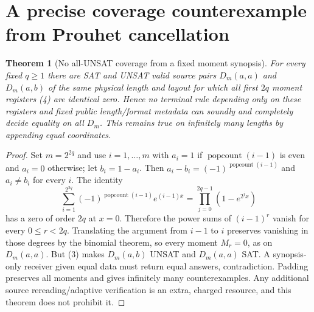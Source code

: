 \documentclass[11pt]{article}
\newtheorem{theorem}{Theorem}
\begin{document}
\section{A precise coverage counterexample from Prouhet cancellation}
\begin{theorem}[No all-UNSAT coverage from a fixed moment synopsis]\label{th:collision}
For every fixed $q\ge1$ there are SAT and UNSAT valid source pairs $D_m(a,a)$ and $D_m(a,b)$ of the \emph{same physical length and layout} for which all first $2q$ moment registers (4) are identical zero. Hence no terminal rule depending only on these registers and fixed public length/format metadata can soundly and completely decide equality on all $D_m$. This remains true on infinitely many lengths by appending equal coordinates.
\end{theorem}
\begin{proof}
Set $m=2^{2q}$ and use $i=1,\ldots,m$ with $a_i=1$ if $\operatorname{popcount}(i-1)$ is even and $a_i=0$ otherwise; let $b_i=1-a_i$. Then $a_i-b_i=(-1)^{\operatorname{popcount}(i-1)}$ and $a_i\ne b_i$ for every $i$. The identity
\[
 \sum_{i=1}^{2^{2q}}(-1)^{\operatorname{popcount}(i-1)}e^{(i-1)x}
 =\prod_{j=0}^{2q-1}(1-e^{2^jx})
\tag{5}
\]
has a zero of order $2q$ at $x=0$. Therefore the power sums of $(i-1)^r$ vanish for every $0\le r<2q$. Translating the argument from $i-1$ to $i$ preserves vanishing in those degrees by the binomial theorem, so every moment $M_r=0$, as on $D_m(a,a)$. But (3) makes $D_m(a,b)$ UNSAT and $D_m(a,a)$ SAT. A synopsis-only receiver given equal data must return equal answers, contradiction. Padding preserves all moments and gives infinitely many counterexamples. Any additional source rereading/adaptive verification is an extra, charged resource, and this theorem does not prohibit it.
\end{proof}
\end{document}
